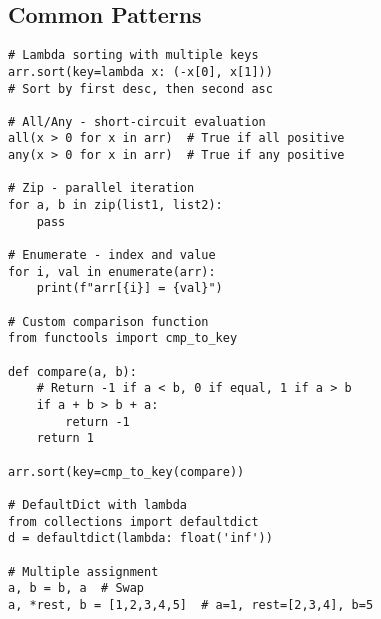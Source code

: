 \subsection{Common Patterns}
\begin{lstlisting}
# Lambda sorting with multiple keys
arr.sort(key=lambda x: (-x[0], x[1]))
# Sort by first desc, then second asc

# All/Any - short-circuit evaluation
all(x > 0 for x in arr)  # True if all positive
any(x > 0 for x in arr)  # True if any positive

# Zip - parallel iteration
for a, b in zip(list1, list2):
    pass

# Enumerate - index and value
for i, val in enumerate(arr):
    print(f"arr[{i}] = {val}")

# Custom comparison function
from functools import cmp_to_key

def compare(a, b):
    # Return -1 if a < b, 0 if equal, 1 if a > b
    if a + b > b + a:
        return -1
    return 1

arr.sort(key=cmp_to_key(compare))

# DefaultDict with lambda
from collections import defaultdict
d = defaultdict(lambda: float('inf'))

# Multiple assignment
a, b = b, a  # Swap
a, *rest, b = [1,2,3,4,5]  # a=1, rest=[2,3,4], b=5
\end{lstlisting}


